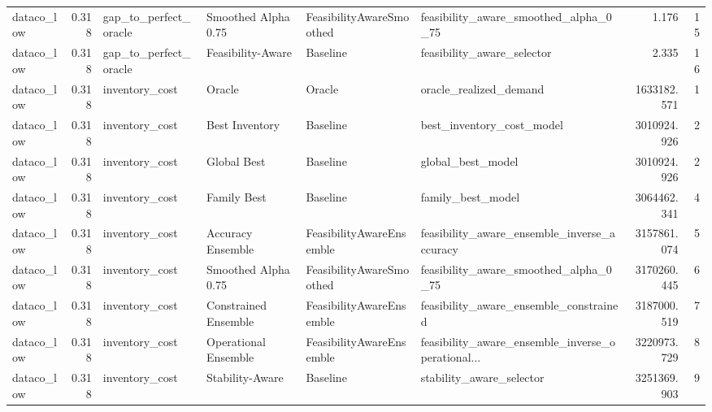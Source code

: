 \begin{table}
{\begin{tabular}{lrllllrr}
    dataco\_low &             0.318 &       gap\_to\_perfect\_oracle &   Smoothed Alpha 0.75 &  FeasibilityAwareSmoothed &              feasibility\_aware\_smoothed\_alpha\_0\_75 &         1.176 &              15 \\
    dataco\_low &             0.318 &       gap\_to\_perfect\_oracle &     Feasibility-Aware &                  Baseline &                         feasibility\_aware\_selector &         2.335 &              16 \\
    dataco\_low &             0.318 &              inventory\_cost &                Oracle &                    Oracle &                             oracle\_realized\_demand &   1633182.571 &               1 \\
    dataco\_low &             0.318 &              inventory\_cost &        Best Inventory &                  Baseline &                          best\_inventory\_cost\_model &   3010924.926 &               2 \\
    dataco\_low &             0.318 &              inventory\_cost &           Global Best &                  Baseline &                                  global\_best\_model &   3010924.926 &               2 \\
    dataco\_low &             0.318 &              inventory\_cost &           Family Best &                  Baseline &                                  family\_best\_model &   3064462.341 &               4 \\
    dataco\_low &             0.318 &              inventory\_cost &     Accuracy Ensemble &  FeasibilityAwareEnsemble &        feasibility\_aware\_ensemble\_inverse\_accuracy &   3157861.074 &               5 \\
    dataco\_low &             0.318 &              inventory\_cost &   Smoothed Alpha 0.75 &  FeasibilityAwareSmoothed &              feasibility\_aware\_smoothed\_alpha\_0\_75 &   3170260.445 &               6 \\
    dataco\_low &             0.318 &              inventory\_cost &  Constrained Ensemble &  FeasibilityAwareEnsemble &             feasibility\_aware\_ensemble\_constrained &   3187000.519 &               7 \\
    dataco\_low &             0.318 &              inventory\_cost &  Operational Ensemble &  FeasibilityAwareEnsemble &  feasibility\_aware\_ensemble\_inverse\_operational... &   3220973.729 &               8 \\
    dataco\_low &             0.318 &              inventory\_cost &       Stability-Aware &                  Baseline &                           stability\_aware\_selector &   3251369.903 &               9 \\

\end{tabular}}
\end{table}
